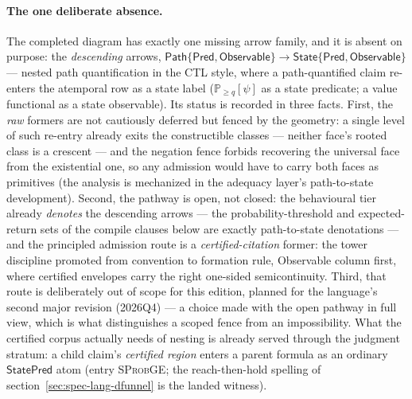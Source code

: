 \paragraph{The one deliberate absence.} The completed diagram has
exactly one missing arrow family, and it is absent on purpose: the
\emph{descending} arrows,
$\mathsf{Path}\{\mathsf{Pred},\mathsf{Observable}\} \to
\mathsf{State}\{\mathsf{Pred},\mathsf{Observable}\}$ --- nested path
quantification in the CTL style, where a path-quantified claim
re-enters the atemporal row as a state label
($\mathbb{P}_{\ge q}[\psi]$ as a state predicate; a value functional
as a state observable). Its status is recorded in three
facts. First, the \emph{raw} formers are not cautiously deferred but
fenced by the geometry: a single level of such re-entry already
exits the constructible classes --- neither face's rooted class is a
crescent --- and the negation fence forbids recovering the universal
face from the existential one, so any admission would have to carry
both faces as primitives (the analysis is mechanized in the adequacy
layer's path-to-state development). Second, the pathway is open, not
closed: the behavioural tier already \emph{denotes} the descending
arrows --- the probability-threshold and expected-return sets of the
compile clauses below are exactly path-to-state denotations --- and
the principled admission route is a \emph{certified-citation}
former: the tower discipline promoted from convention to formation
rule, Observable column first, where certified envelopes carry the
right one-sided semicontinuity. Third, that route is deliberately
out of scope for this edition, planned for the language's second
major revision (2026Q4) --- a choice made with the open pathway in
full view, which is what distinguishes a scoped fence from an
impossibility. What the
certified corpus actually needs of nesting is already served through
the judgment stratum: a child claim's \emph{certified region} enters
a parent formula as an ordinary $\mathsf{StatePred}$ atom
(entry \textsc{SProbGE}; the reach-then-hold spelling of
section~\ref{sec:spec-lang-dfunnel} is the landed witness).

